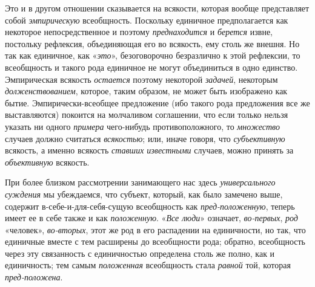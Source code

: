 \documentclass[twoside]{article}
\begin{document}
{{\label{bkm:bm38a}Это и в другом отношении сказывается на
всякости, которая вообще представляет собой
{\em эмпирическую}
всеобщность. Поскольку единичное предполагается как некоторое
непосредственное и поэтому
{\em преднаходится} и
{\em берется} извне,
постольку рефлексия, объединяющая его во всякость, ему столь же внешня. Но
так как единичное, как «{\em это}»,
безоговорочно безразлично к этой рефлексии, то всеобщность и
такого рода единичное не могут объединиться в одно единство. Эмпирическая
всякость {\em остается}
поэтому некоторой
{\em задачей}, некоторым
{\em долженствованием},
которое, таким образом, не может быть изображено как бытие.
Эмпирически-всеобщее предложение (ибо такого рода предложения все же
выставляются) покоится на молчаливом соглашении, что если только нельзя
указать ни одного {\em примера}
чего-нибудь противоположного, то
{\em множество} случаев
должно считаться {\em всякостью};
или, иначе говоря, что
{\em субъективную}
всякость, а именно всякость
{\em ставших известными}
случаев, можно принять за
{\em объективную}
всякость.

При более близком рассмотрении занимающего нас здесь
{\em универсального суждения}
мы убеждаемся, что субъект, который, как было замечено выше,
содержит в-себе-и-для-себя-сущую всеобщность как
{\em пред-положенную},
теперь имеет ее в себе также и как
{\em положенную}.
«{\em Все люди}» означает,
{\em во-первых},
{\em род} «человек»,
{\em во-вторых}, этот же
род в его распадении на единичности, но так, что единичные вместе с тем
расширены до всеобщности рода; обратно, всеобщность через эту связанность с
единичностью определена столь же полно, как и единичность; тем самым
{\em положенная}
всеобщность стала
{\em равной} той, которая
{\em пред-положена}.

}}
\end{document}
